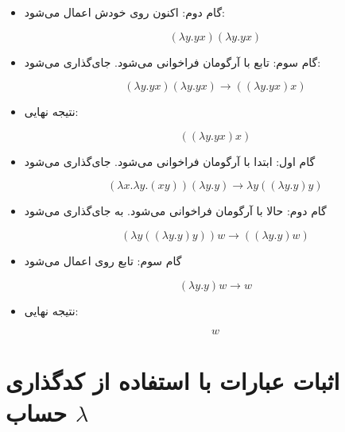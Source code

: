 \documentclass[11pt, a4paper, oneside]{article}
\newcounter{itemadded}
\let\LaTeXStandardEnumerateBegin\enumerate
\let\LaTeXStandardEnumerateEnd\endenumerate
\renewenvironment{enumerate}{%
	\LaTeXStandardEnumerateBegin%
	\setcounter{itemadded}{0}
}{%
	\LaTeXStandardEnumerateEnd%
}%
\begin{document}
\begin{enumerate}
\begin{itemize}
				\item {\large گام دوم}: اکنون  روی خودش اعمال می‌شود:
				
				\[
				(\lambda y.yx)(\lambda y.yx)
				\]
				
				\item {\large گام سوم}: تابع  با آرگومان  فراخوانی می‌شود.  جای‌گذاری می‌شود:
				
				\[
				(\lambda y.yx)(\lambda y.yx) \rightarrow ((\lambda y.yx)x)
				\]
				
				\item {\large نتیجه نهایی}:
				
				\[
				((\lambda y.yx)x)
				\]
				
			\end{itemize}
			
			\item {}
						
			\begin{itemize}
				
				\item {\large گام اول}: ابتدا  با آرگومان  فراخوانی می‌شود.  جای‌گذاری می‌شود
				
				\[
				(\lambda x.\lambda y.(xy))(\lambda y.y) \rightarrow \lambda y((\lambda y.y)y)
				\]
				
				\item {\large گام دوم}: حالا  با آرگومان  فراخوانی می‌شود.  به  جای‌گذاری می‌شود
				
				\[
				(\lambda y((\lambda y.y)y))w \rightarrow ((\lambda y.y)w)
				\]
				
				\item {\large گام سوم}: تابع  روی  اعمال می‌شود
				
				\[
				(\lambda y.y)w \rightarrow w
				\]
				
				\item {\large نتیجه نهایی}:
				
				\[
				w
				\]
				
			\end{itemize}
			
		\end{enumerate}
		
	\section{اثبات عبارات با استفاده از کدگذاری حساب $\lambda$}
	
\end{document}
